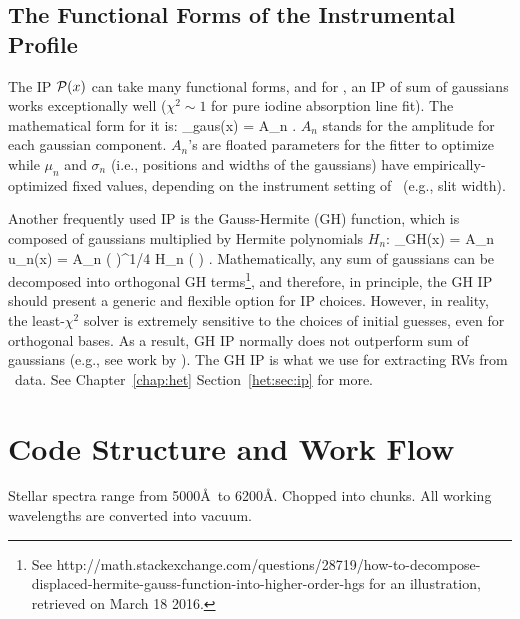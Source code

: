 \subsection{The Functional Forms of the Instrumental Profile}
The IP $\mathcal{P}(x)$ can take many functional forms, and for \keck, an IP of sum of
gaussians works exceptionally well ($\chi^2 \sim 1$ for pure iodine
absorption line fit). The mathematical form for it is:
\beq
\curlyp_{\rm gaus}(x) = \sum A_n . 
\eeq
$A_n$ stands for the amplitude for each gaussian component. $A_n$'s
are floated parameters for the fitter to optimize while $\mu_n$ and
$\sigma_n$ (i.e., positions and widths of the gaussians) have
empirically-optimized fixed values, depending on the instrument
setting of \keck\ (e.g., slit width).

Another frequently used IP is the Gauss-Hermite (GH)
function, which is composed of gaussians multiplied by Hermite
polynomials $H_n$:
\beq
\curlyp_{\rm GH}(x) = \sum A_n u_n(x) = \sum A_n 
\left(  \right)^{1/4}  H_n
\left(  \right) .
\eeq
Mathematically, any sum of gaussians can be decomposed into orthogonal
GH terms\footnote{See
  http://math.stackexchange.com/questions/28719/how-to-decompose-displaced-hermite-gauss-function-into-higher-order-hgs
  for an illustration, retrieved on March 18 2016.}, and therefore, in
principle, the GH IP should present a generic and flexible option for
IP choices. However, in reality, the least-$\chi^2$ solver is
extremely sensitive to the choices of initial guesses, even for
orthogonal bases. As a result, GH IP normally does not outperform sum
of gaussians (e.g., see work by \citealt{2013AAS...22114908V}). The GH
IP is what we use for extracting RVs from \het\ data. See
Chapter~\ref{chap:het} Section~\ref{het:sec:ip} for more.




\section{Code Structure and Work Flow}

Stellar spectra range from 5000\AA\ to 6200\AA. Chopped into
chunks. All working wavelengths are converted into vacuum. 


